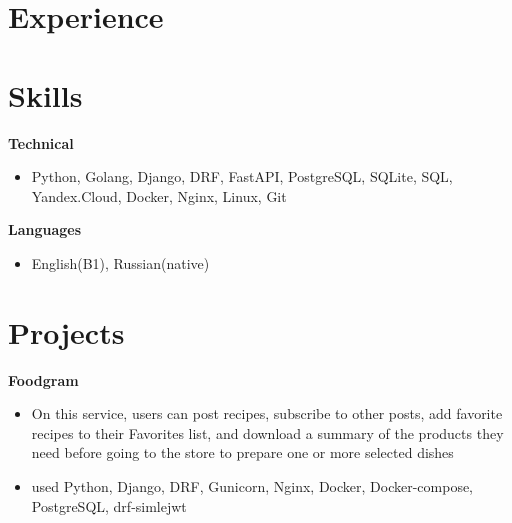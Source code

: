 \documentclass{clean_cv}
\begin{document}
\begin{datetabular}{9em}
\end{datetabular}

\section{Experience}

\begin{datetabular}{9em}

\end{datetabular}

\section{Skills}

\textbf{Technical}
 \begin{itemize}
   \item Python, Golang, Django, DRF, FastAPI, PostgreSQL, SQLite, SQL, Yandex.Cloud, Docker, Nginx, Linux, Git
   \end{itemize}
   \vspace{0.5cm}

\textbf{Languages}
 \begin{itemize}
   \item English(B1), Russian(native)
   \end{itemize}
   \vspace{0.5cm}
\section{Projects}

\textbf{Foodgram}\href{https://github.com/Chinpakamon/foodgram-project-react}{\color{blue}}
 \begin{itemize}
   \item  On this service, users can post recipes, subscribe to other posts, add favorite recipes to their Favorites list, and download a summary of the products they need before going to the store to prepare one or more selected dishes
   \item used Python, Django, DRF, Gunicorn, Nginx, Docker, Docker-compose, PostgreSQL, drf-simlejwt
   \end{itemize}
   \vspace{0.5cm}
\end{document}
